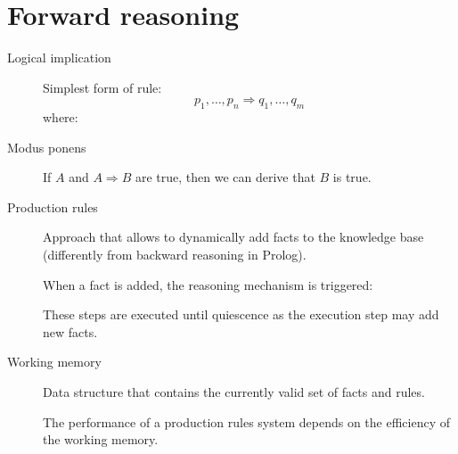\chapter{Forward reasoning}

\begin{description}
    \item[Logical implication] 
        Simplest form of rule:
        \[ p_1, \dots, p_n \Rightarrow q_1, \dots, q_m \]
        where:
    
    \item[Modus ponens] 
        If $A$ and $A \Rightarrow B$ are true, then we can derive that $B$ is true.

    \item[Production rules] 
        Approach that allows to dynamically add facts to the knowledge base (differently from backward reasoning in Prolog).

        When a fact is added, the reasoning mechanism is triggered:
        These steps are executed until quiescence as the execution step may add new facts.

    \item[Working memory] 
        Data structure that contains the currently valid set of facts and rules.

        The performance of a production rules system depends on the efficiency of the working memory.
\end{description}



